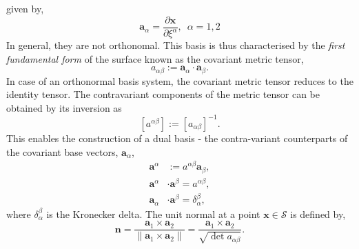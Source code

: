  given by,
 \begin{equation}\label{tangent_parametric}
    \boldsymbol{a}_{\alpha} = \frac{\partial \boldsymbol{x}}{\partial \xi^{\alpha}}, \,\,\, \alpha = 1, 2
 \end{equation}
In general, they are not orthonomal. This basis is thus characterised by the \emph{first fundamental form} of the surface known as the covariant metric tensor,
\begin{equation}\label{metric_def}
    a_{\alpha \beta} := \boldsymbol{a}_{\alpha} \cdot \boldsymbol{a}_{\beta}.
\end{equation}
In case of an orthonormal basis system, the covariant metric tensor reduces to the identity tensor. The contravariant components of the metric tensor can be obtained by its inversion as
\begin{equation}\label{contravar_metric_def}
    [a^{\alpha \beta}] := [a_{\alpha \beta}]^{-1}.
\end{equation}
This enables the construction of a dual basis - the contra-variant counterparts of the covariant base vectors, $\boldsymbol{a}_{\alpha}$,
\begin{align}\label{contravar_def}
    \boldsymbol{a}^{\alpha} &:= a^{\alpha \beta} \boldsymbol{a}_{\beta},\\
    \boldsymbol{a}^{\alpha} &\cdot \boldsymbol{a}^{\beta} = a^{\alpha \beta},\\
    \boldsymbol{a}_{\alpha} &\cdot \boldsymbol{a}^{\beta} = \delta^{\beta}_{\alpha},
\end{align}
where $\delta^{\beta}_{\alpha}$ is the Kronecker delta.
%
The unit normal at a point $\boldsymbol{x} \in \mathcal{S}$ is defined by,
\begin{equation}\label{normal}
    \boldsymbol{n} = \frac{\boldsymbol{a}_{1} \times \boldsymbol{a}_{2}}{\| \boldsymbol{a}_{1} \times \boldsymbol{a}_{2} \|}
    = \frac{\boldsymbol{a}_{1} \times \boldsymbol{a}_{2}}{\sqrt{\det a_{\alpha \beta}}}.
\end{equation}

